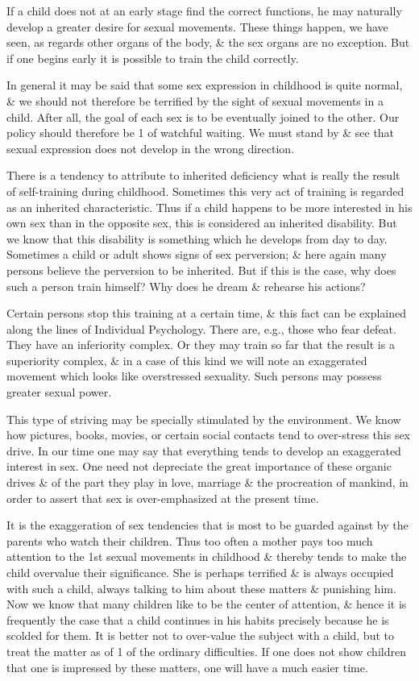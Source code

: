 \documentclass{article}
\begin{document}
If a child does not at an early stage find the correct functions, he may naturally develop a greater desire for sexual movements. These things happen, we have seen, as regards other organs of the body, \& the sex organs are no exception. But if one begins early it is possible to train the child correctly.

In general it may be said that some sex expression in childhood is quite normal, \& we should not therefore be terrified by the sight of sexual movements in a child. After all, the goal of each sex is to be eventually joined to the other. Our policy should therefore be 1 of watchful waiting. We must stand by \& see that sexual expression does not develop in the wrong direction.

There is a tendency to attribute to inherited deficiency what is really the result of self-training during childhood. Sometimes this very act of training is regarded as an inherited characteristic. Thus if a child happens to be more interested in his own sex than in the opposite sex, this is considered an inherited disability. But we know that this disability is something which he develops from day to day. Sometimes a child or adult shows signs of sex perversion; \& here again many persons believe the perversion to be inherited. But if this is the case, why does such a person train himself? Why does he dream \& rehearse his actions?

Certain persons stop this training at a certain time, \& this fact can be explained along the lines of Individual Psychology. There are, e.g., those who fear defeat. They have an inferiority complex. Or they may train so far that the result is a superiority complex, \& in a case of this kind we will note an exaggerated movement which looks like overstressed sexuality. Such persons may possess greater sexual power.

This type of striving may be specially stimulated by the environment. We know how pictures, books, movies, or certain social contacts tend to over-stress this sex drive. In our time one may say that everything tends to develop an exaggerated interest in sex. One need not depreciate the great importance of these organic drives \& of the part they play in love, marriage \& the procreation of mankind, in order to assert that sex is over-emphasized at the present time.

It is the exaggeration of sex tendencies that is most to be guarded against by the parents who watch their children. Thus too often a mother pays too much attention to the 1st sexual movements in childhood \& thereby tends to make the child overvalue their significance. She is perhaps terrified \& is always occupied with such a child, always talking to him about these matters \& punishing him. Now we know that many children like to be the center of attention, \& hence it is frequently the case that a child continues in his habits precisely because he is scolded for them. It is better not to over-value the subject with a child, but to treat the matter as of 1 of the ordinary difficulties. If one does not show children that one is impressed by these matters, one will have a much easier time.
\end{document}
